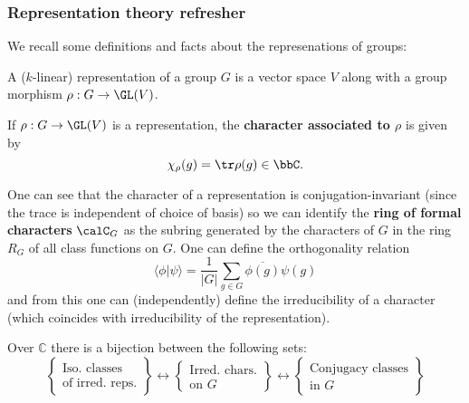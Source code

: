 \documentclass[12pt]{article}
\begin{document}
		\subsubsection{Representation theory refresher}
		We recall some definitions and facts about the represenations of groups:
		\begin{defn}
			A ($k$-linear) representation of a group $G$ is a vector space $V$ along with a group morphism $\rho:G\to \GL(V)$.
		\end{defn}
		\begin{defn}
			If $\rho:G\to \GL(V)$ is a representation, the \textbf{character associated to $\rho$} is given by
			\[\chi_\rho(g)=\tr\rho(g)\in\bbC.\]
		\end{defn}
		\begin{rmk}
			One can see that the character of a representation is conjugation-invariant (since the trace is independent of choice of basis)
			so we can identify the \textbf{ring of formal characters} $\calC_G$ as the subring generated by the characters of $G$ in the ring $R_G$ of all class functions 
			on $G$. One can define the orthogonality relation 
			\[\langle\phi|\psi\rangle=\frac{1}{|G|}\sum_{g\in G}\overline{\phi(g)}\psi(g)\]
			and from this one can (independently) define the irreducibility of a character (which coincides with irreducibility of the representation).
		\end{rmk}
		\begin{thm}
			Over $\mathbb C$ there is a bijection between the following sets: 
			\[\begin{Bmatrix}\text{Iso. classes}\\\text{of irred. reps.}\end{Bmatrix}\leftrightarrow\begin{Bmatrix}
				\text{Irred. chars.}\\\text{on $G$}
			\end{Bmatrix}\leftrightarrow \begin{Bmatrix}
				\text{Conjugacy classes}\\\text{in $G$}
			\end{Bmatrix}\]
		\end{thm}
\end{document}
